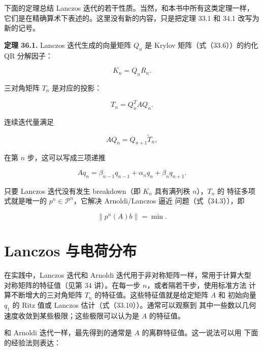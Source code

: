 \documentclass[UTF8,fontset=none,12pt]{ctexart}
\begin{document}
下面的定理总结 Lanczos 迭代的若干性质。当然，和本书中所有这类定理一样，
它们是在精确算术下表述的。这里没有新的内容，只是把定理 33.1 和 34.1
改写为新的记号。

\textbf{定理 36.1.}
Lanczos 迭代生成的向量矩阵 $Q_n$ 是 Krylov 矩阵（式（33.6））的约化
QR 分解因子：

\begin{equation}
K_n=Q_nR_n.
\tag{36.4}
\end{equation}

三对角矩阵 $T_n$ 是对应的投影：

\begin{equation}
T_n=Q_n^TAQ_n.
\tag{36.5}
\end{equation}

连续迭代量满足

\begin{equation}
AQ_n=Q_{n+1}\widetilde T_n,
\tag{36.6}
\end{equation}

在第 $n$ 步，这可以写成三项递推

\begin{equation}
Aq_n=\beta_{n-1}q_{n-1}+\alpha_nq_n+\beta_nq_{n+1}.
\tag{36.7}
\end{equation}

只要 Lanczos 迭代没有发生 breakdown（即 $K_n$ 具有满列秩 $n$），$T_n$ 的
特征多项式就是唯一的 $p^n\in\mathcal P^n$，它解决 Arnoldi/Lanczos 逼近
问题（式（34.3）），即

\begin{equation}
\lVert p^n(A)b\rVert=\min.
\tag{36.8}
\end{equation}

\section*{Lanczos 与电荷分布}

在实践中，Lanczos 迭代和 Arnoldi 迭代用于非对称矩阵一样，常用于计算大型
对称矩阵的特征值（见第 34 讲）。在每一步 $n$，或者隔若干步，使用标准方法
计算不断增大的三对角矩阵 $T_n$ 的特征值。这些特征值就是给定矩阵 $A$ 和
初始向量 $q_1$ 的 Ritz 值或 Lanczos 估计（式（33.10））。通常可以观察到
其中一些数以几何速度收敛到某些极限；这些极限可以认为是 $A$ 的特征值。

和 Arnoldi 迭代一样，最先得到的通常是 $A$ 的离群特征值。这一说法可以用
下面的经验法则表达：

\begin{center}
\end{center}
\end{document}
